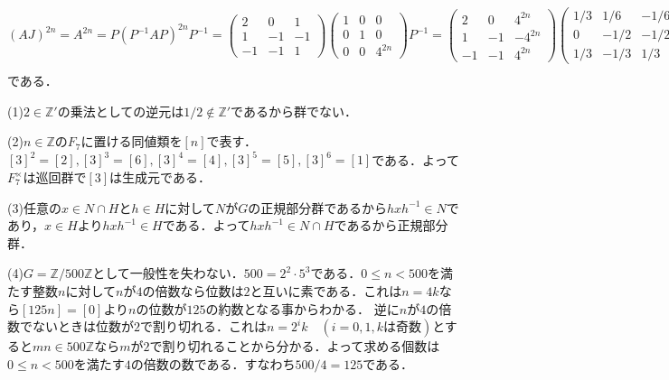 \documentclass[
		book,
		head_space=20mm,
		foot_space=20mm,
		gutter=10mm,
		line_length=190mm
]{jlreq}
\begin{document}
$(AJ)^{2n}=A^{2n}=P(P^{-1}AP)^{2n}P^{-1}=\begin{pmatrix}
    2 & 0 & 1 \\
    1 & -1 & -1 \\
    -1 & -1 & 1
    \end{pmatrix}\begin{pmatrix}
    1 & 0 & 0 \\
    0 & 1 & 0 \\
    0 & 0 & 4^{2n}
    \end{pmatrix}P^{-1}=\begin{pmatrix}
        2 & 0 & 4^{2n} \\
        1 & -1 & -4^{2n} \\
        -1 & -1 & 4^{2n}
    \end{pmatrix}\begin{pmatrix}
        1/3 & 1/6 & -1/6 \\
        0 & -1/2 & -1/2 \\
        1/3 & -1/3 & 1/3
    \end{pmatrix}=\begin{pmatrix}
        \frac{1}{3}(2+4^{2n}) & \frac{1}{3}(1-4^{2n}) & \frac{-1}{3}(1-4^{2n})\\
        \frac{1}{3}(1-4^{2n}) & \frac{1}{3}(2+4^{2n}) & \frac{1}{3}(1-4^{2n})\\
        \frac{1}{3}(-1+4^{2n}) & \frac{1}{3}(1-4^{2n}) & \frac{1}{3}(2+4^{2n})
    \end{pmatrix}$である．
        
(1)$2 \in \mathbb{Z}'$の乗法としての逆元は$1/2\notin \mathbb{Z}'$であるから群でない．

(2)$n \in \mathbb{Z}$の$F_7$に置ける同値類を$[n]$で表す．$[3]^2=[2],[3]^3=[6],[3]^4=[4],[3]^5=[5],[3]^6=[1]$である．よって$F_7^{\times}$は巡回群で$[3]$は生成元である．

(3)任意の$x \in N \cap H$と$h \in H$に対して$N$が$G$の正規部分群であるから$hxh^{-1} \in N$であり，$x \in H$より$hxh^{-1}\in H$である．よって$hxh^{-1}\in N \cap H$であるから正規部分群．

(4)$G=\mathbb{Z}/500 \mathbb{Z}$として一般性を失わない．$500=2^2\cdot5^3$である．$0 \le n <500$を満たす整数$n$に対して$n$が$4$の倍数なら位数は$2$と互いに素である．これは$n=4k$なら$[125n]=[0]$より$n$の位数が$125$の約数となる事からわかる．
逆に$n$が$4$の倍数でないときは位数が$2$で割り切れる．これは$n=2^ik \quad(i=0,1,k \text{は奇数})$とすると$mn\in 500\mathbb{Z} $なら$m$が$2$で割り切れることから分かる．よって求める個数は$0 \le n <500$を満たす$4$の倍数の数である．すなわち$500/4=125$である．
\end{document}
